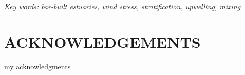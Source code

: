\documentclass[11pt,letterpaper]{article}
\begin{document}
    \textit{Key words: bar-built estuaries, wind stress, stratification, upwelling, mixing}

    \newpage
    \section*{ACKNOWLEDGEMENTS}
    
    my acknowledgments
    \newpage
    
    \tableofcontents
    
    \listoffigures
    
    \listoftables
    
    \newpage
    
    
    
    
    
    
    \newpage
    
    \newpage
    


\end{document}
